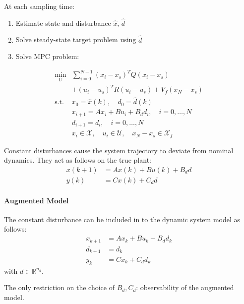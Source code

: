 At each sampling time:
\begin{enumerate}
    \item Estimate state and disturbance $\hat{x}$, $\hat{d}$
    \item Solve steady-state target problem using $\hat{d}$
    \item Solve MPC problem:
\end{enumerate}
\begin{align*}
    \min_U       & \sum_{i=0}^{N-1} {(x_i - x_s)}^T Q (x_i - x_s)                                    \\
                 & + {(u_i - u_s)}^T R (u_i - u_s) + V_f(x_N - x_s)                                  \\
    \text{s.t. } & x_0 = \hat{x}(k), \quad d_0 = \hat{d}(k)                                          \\
                 & x_{i+1} = Ax_i + Bu_i + B_d d_i, \quad i = 0, \dots, N                            \\
                 & d_{i+1} = d_i, \quad i = 0, \dots, N                                              \\
                 & x_i \in \mathcal{X}, \quad u_i \in \mathcal{U}, \quad x_N - x_s \in \mathcal{X}_f
\end{align*}
\newpar{}

Constant disturbances cause the system trajectory to deviate from nominal dynamics. They act as follows on the true plant:
\begin{align*}
    x(k+1) & = Ax(k) + Bu(k) + B_d d \\
    y(k)   & = Cx(k) + C_d d
\end{align*}

\paragraph{Augmented Model}

The constant disturbance can be included in to the dynamic system model as follows:
\begin{align*}
    x_{k+1} & = Ax_k + Bu_k + B_d d_k \\
    d_{k+1} & = d_k                   \\
    y_k     & = Cx_k + C_d d_k
\end{align*}
with $d \in \mathbb{R}^{n_d}$.

The only restriction on the choice of $B_d, C_d$: observability of the augmented model.
\newpar{}


